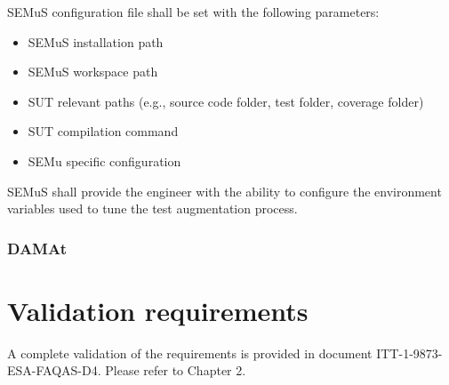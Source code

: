 \RQ{} SEMuS configuration file shall be set with the following parameters:
	\begin{itemize}
		\item SEMuS installation path
		\item SEMuS workspace path
		\item SUT relevant paths (e.g., source code folder, test folder, coverage folder)
		\item SUT compilation command
		\item SEMu specific configuration
	\end{itemize}


\RQ{} SEMuS shall provide the engineer with the ability to configure the environment variables used to tune the test augmentation process.

\subsection{DAMAt}




\chapter{Validation requirements}

A complete validation of the \FAQAS requirements is provided in document ITT-1-9873-ESA-FAQAS-D4. Please refer to Chapter 2. 